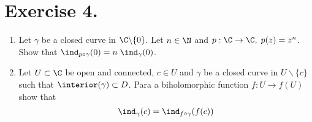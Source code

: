 \section*{Exercise 4.}

\begin{enumerate}[label=(\alph*)]
    \item Let $\gamma$ be a closed curve in $\C \backslash \{0\}$. Let $n\in \N$ and $p: \C\to \C,\; p(z) = z^n$. Show that $\ind_{p\circ \gamma}(0) = n\; \ind_\gamma(0)$.
    \item Let $U\subset \C$ be open and connected, $c\in U$ and $\gamma$ be a closed curve in $U \backslash \{c\}$ such that $\interior(\gamma) \subset D$. Para a biholomorphic function $f: U \to f(U)$ show that
    \[ \ind_\gamma(c) = \ind_{f\circ \gamma}(f(c)) \]
\end{enumerate}
